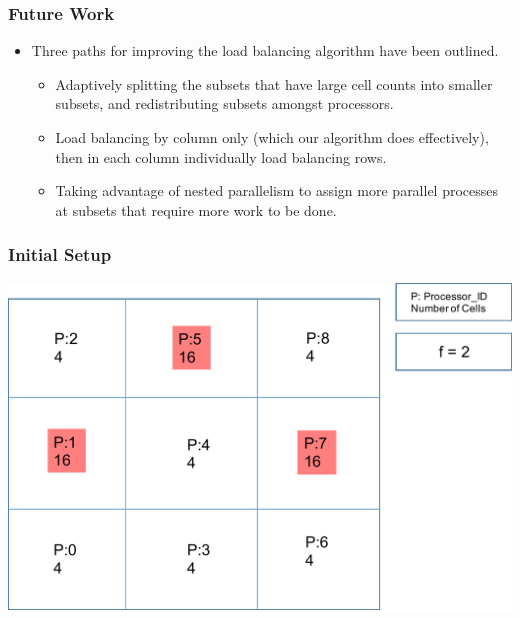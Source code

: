 \documentclass[compress]{beamer}
\begin{document}
\begin{frame}[t]\frametitle{Future Work}
\begin{block}{}
\begin{itemize}
\item Three paths for improving the load balancing algorithm have been outlined.
\begin{itemize} 
\item Adaptively splitting the subsets that have large cell counts into smaller subsets, and redistributing subsets amongst processors.
\item Load balancing by column only (which our algorithm does effectively), then in each column individually load balancing rows. 
\item Taking advantage of nested parallelism to assign more parallel processes at subsets that require more work to be done.
\end{itemize}
\end{itemize}
\end{block}
\end{frame}

\begin{frame}[t]\frametitle{Initial Setup}
\centering
\includegraphics[scale=0.5]{figures/initial_setup.pdf}
\end{frame}
\end{document}
